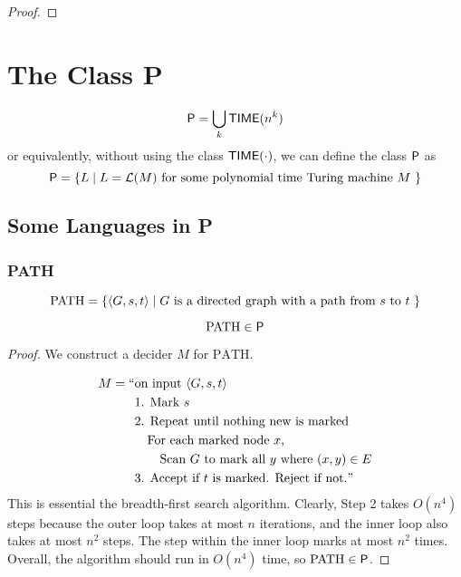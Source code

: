 \begin{proof}
    
\end{proof}


\section{The Class P}

\vspace{\parskip}

\begin{definition}[P]
    $$
    \mathsf{P} = \bigcup_{k} \mathsf{TIME}(n^k)
    $$
    or equivalently, without using the class $\mathsf{TIME}(\cdot)$, we can define the class $\mathsf{P}$ as
    $$
    \mathsf{P} = \{ L \mid \text{$L=\mathcal{L}(M)$ for some polynomial time Turing machine $M$ }\}
    $$
\end{definition}

\subsection{Some Languages in P}

\subsubsection{PATH}

\vspace{\parskip}

\begin{definition}
    $$
    \mathrm{PATH} = \{ \langle G,s,t \rangle \mid \text{$G$ is a directed graph with a path from $s$ to $t$ }\}
    $$
\end{definition}

\begin{theorem}
    $$
    \mathrm{PATH} \in \mathsf{P}
    $$ 
\end{theorem}

\begin{proof}
    We construct a decider $M$ for $\mathrm{PATH}$.

    $$
    \begin{aligned}
        M = ``&\text{on input $\langle G,s,t \rangle$} \\
        &\text{1. Mark $s$} \\
        &\text{2. Repeat until nothing new is marked} \\
        &\text{\quad For each marked node $x$,} \\
        &\text{\quad\quad Scan $G$ to mark all $y$ where $(x,y) \in E$} \\
        &\text{3. Accept if $t$ is marked. Reject if not.}"
    \end{aligned}
    $$
    This is essential the breadth-first search algorithm. Clearly, Step 2 takes $O(n^4)$ steps because the outer loop takes at most $n$ iterations, and the inner loop also takes at most $n^2$ steps. The step within the inner loop marks at most $n^2$ times. Overall, the algorithm should run in $O(n^4)$ time, so $\mathrm{PATH} \in \mathsf{P}$.
\end{proof}

